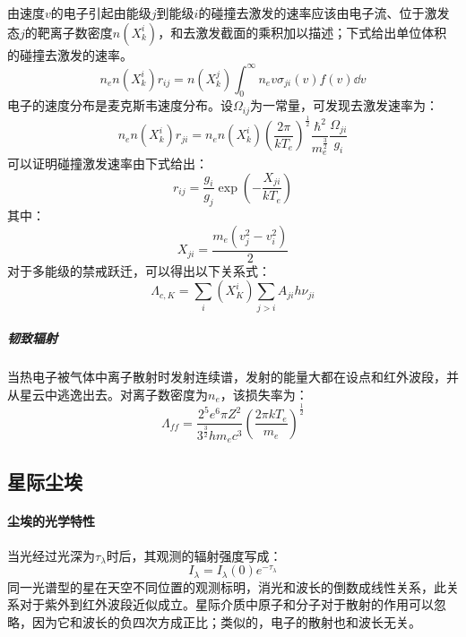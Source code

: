 由速度$v$的电子引起由能级$j$到能级$i$的碰撞去激发的速率应该由电子流、位于激发态$j$的靶离子数密度$n(X_{k}^{i})$，和去激发截面的乘积加以描述；下式给出单位体积的碰撞去激发的速率。
\begin{equation}
	n_{e}n(X_{k}^{i})r_{ij}=n(X_{k}^j)\int_{0}^{\infty}n_{e}v\sigma_{ji}(v)f(v)\dd v
\end{equation}
电子的速度分布是麦克斯韦速度分布。设$\Omega_{ij}$为一常量，可发现去激发速率为：
\begin{equation}
	n_{e}n(X_{k}^{i})r_{ji}=n_{e}n(X_{k}^{i})\left(\frac{2\pi}{kT_{e}}\right)^{\frac{1}{2}}\frac{\hbar^2}{m_{e}^{\frac{3}{2}}}\frac{\Omega_{ji}}{g_{i}}
\end{equation}
可以证明碰撞激发速率由下式给出：
\begin{equation}
	r_{ij}=\frac{g_{i}}{g_{j}}\exp(-\frac{X_{ji}}{kT_{e}})
\end{equation}
其中：
\begin{equation}
	X_{ji}=\frac{m_{e}\left(v_{j}^2-v_{i}^2\right)}{2}
\end{equation}
对于多能级的禁戒跃迁，可以得出以下关系式：
\begin{equation}
	\varLambda_{c,K}=\sum_{i}(X_{K}^{i})\sum_{j>i}A_{ji}h\nu_{ji}
\end{equation}
\subparagraph{韧致辐射}当热电子被气体中离子散射时发射连续谱，发射的能量大都在设点和红外波段，并从星云中逃逸出去。对离子数密度为$n_{e}$，该损失率为：
\begin{equation}
	\varLambda_{ff}=\frac{2^5e^6\pi Z^2}{3^{\frac{3}{2}}hm_{e}c^3}\left(\frac{2\pi k T_{e}}{m_{e}}\right)^{\frac{1}{2}}
\end{equation}
\subsection{星际尘埃}
\paragraph{尘埃的光学特性}
当光经过光深为$\tau_{\lambda}$时后，其观测的辐射强度写成：
\begin{equation}
	I_{\lambda}=I_{\lambda}(0)e^{-\tau_{\lambda}}
\end{equation}
同一光谱型的星在天空不同位置的观测标明，消光和波长的倒数成线性关系，此关系对于紫外到红外波段近似成立。星际介质中原子和分子对于散射的作用可以忽略，因为它和波长的负四次方成正比；类似的，电子的散射也和波长无关。

